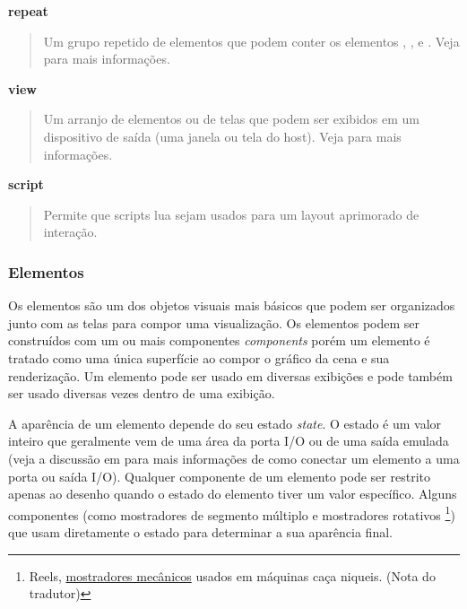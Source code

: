 \documentclass[letterpaper,10pt,brazil]{sphinxmanual}
\begin{document}
\textbf{repeat}
\begin{quote}

Um grupo repetido de elementos que podem conter os elementos
, ,  e .
Veja {\hyperref[techspecs/layout_files:layout\string-parts\string-repeats]{}} para mais informações.
\end{quote}

\textbf{view}
\begin{quote}

Um arranjo de elementos ou de telas que podem ser exibidos em um
dispositivo de saída (uma janela ou tela do host).
Veja {\hyperref[techspecs/layout_files:layout\string-parts\string-views]{}} para mais informações.
\end{quote}

\textbf{script}
\begin{quote}

Permite que scripts lua sejam usados para um layout aprimorado de
interação.
\end{quote}


\subsubsection{Elementos}
\label{techspecs/layout_files:layout-parts-elements}\label{techspecs/layout_files:elementos}
Os elementos são um dos objetos visuais mais básicos que podem ser
organizados junto com as telas para compor uma visualização. Os
elementos podem ser construídos com um ou mais componentes \emph{components}
porém um elemento é tratado como uma única superfície ao compor o
gráfico da cena e sua renderização. Um elemento pode ser usado em
diversas exibições e pode também ser usado diversas vezes dentro de
uma exibição.

A aparência de um elemento depende do seu estado \emph{state}. O estado é um
valor inteiro que geralmente vem de uma área da porta I/O ou de uma
saída emulada (veja a discussão em {\hyperref[techspecs/layout_files:layout\string-parts\string-views]{}} para
mais informações de como conectar um elemento a uma porta ou saída I/O).
Qualquer componente de um elemento pode ser restrito apenas ao desenho
quando o estado do elemento tiver um valor específico. Alguns
componentes (como mostradores de segmento múltiplo e mostradores
rotativos \footnote[7]{\sphinxAtStartFootnote%
Reels, \href{https://i.postimg.cc/FF2GYc9v/Reels.jpg}{mostradores mecânicos} usados em máquinas
caça niqueis. (Nota do tradutor)
}) que usam diretamente o estado para determinar a sua
aparência final.
\end{document}
